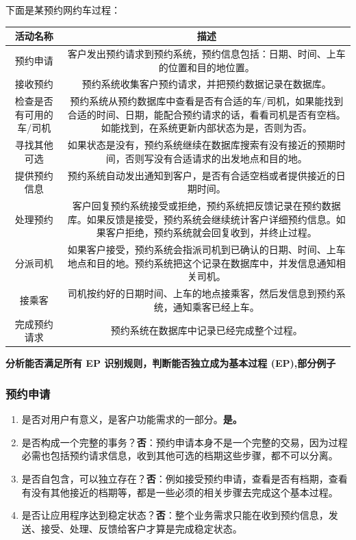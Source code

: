 下面是某预约网约车过程：


\begin{tabular}{|c|c|}
\hline
活动名称&描述\\
\hline
预约申请&客户发出预约请求到预约系统，预约信息包括：日期、时间、上车的位置和目的地位置。\\
\hline
接收预约&预约系统收集客户预约请求，并把预约数据记录在数据库。\\
\hline
检查是否有可用的车/司机&预约系统从预约数据库中查看是否有合适的车/司机，如果能找到合适的时间、日期，能配合预约请求的话，看看司机是否有空档。如能找到，在系统更新内部状态为是，否则为否。 \\
\hline
寻找其他可选&如果状态是没有，预约系统继续在数据库搜索有没有接近的预期时间，否则写没有合适请求的出发地点和目的地。 \\
\hline
提供预约信息&预约系统自动发出通知到客户，是否有合适空档或者提供接近的日期时间。 \\
\hline
处理预约&客户回复预约系统接受或拒绝，预约系统把反馈记录在预约数据库。如果反馈是接受，预约系统会继续统计客户详细预约信息。如果客户拒绝，预约系统就会回复收到，并终止过程。 \\
\hline
分派司机&如果客户接受，预约系统会指派司机到已确认的日期、时间、上车地点和目的地。预约系统把这个记录在数据库中，并发信息通知相关司机。 \\
\hline
接乘客&司机按约好的日期时间、上车的地点接乘客，然后发信息到预约系统，通知乘客已经上车。\\
\hline
完成预约请求&预约系统在数据库中记录已经完成整个过程。\\
\hline
\end{tabular}

\textbf{分析能否满足所有 EP 识别规则，判断能否独立成为基本过程
(EP),部分例子}

\hypertarget{ux9884ux7ea6ux7533ux8bf7}{%
\subsubsection{预约申请}\label{ux9884ux7ea6ux7533ux8bf7}}

\begin{enumerate}
\tightlist
\item
  是否对用户有意义，是客户功能需求的一部分。\textbf{是。}
\item
  是否构成一个完整的事务？\textbf{否}：预约申请本身不是一个完整的交易，因为过程必需也包括预约请求信息，收到其他可选的档期这些步骤，都不可以分离。
\item
  是否自包含，可以独立存在？\textbf{否}：例如接受预约申请，查看是否有档期，查看有没有其他接近的档期等，都是一些必须的相关步骤去完成这个基本过程。
\item
  是否让应用程序达到稳定状态？\textbf{否}：整个业务需求只能在收到预约信息，发送、接受、处理、反馈给客户才算是完成稳定状态。
\end{enumerate}


